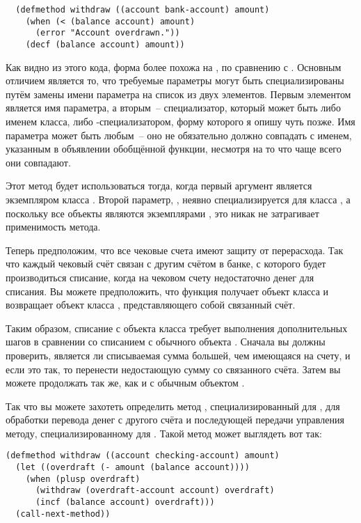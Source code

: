 \begin{lstlisting}
  (defmethod withdraw ((account bank-account) amount)
    (when (< (balance account) amount)
      (error "Account overdrawn."))
    (decf (balance account) amount))
\end{lstlisting}

Как видно из этого кода, форма  более похожа на , по сравнению
с .  Основным отличием является то, что требуемые параметры могут быть
специализированы путём замены имени параметра на список из двух элементов.  Первым
элементом является имя параметра, а вторым~-- специализатор, который может быть либо
именем класса, либо -специализатором, форму которого я опишу чуть позже.  Имя
параметра может быть любым~-- оно не обязательно должно совпадать с именем, указанным в
объявлении обобщённой функции, несмотря на то что чаще всего они совпадают.

Этот метод будет использоваться тогда, когда первый аргумент  является
экземпляром класса .  Второй параметр, , неявно
специализируется для класса , а поскольку все объекты являются экземплярами
, это никак не затрагивает применимость метода.

Теперь предположим, что все чековые счета имеют защиту от перерасхода.  Так что каждый
чековый счёт связан с другим счётом в банке, с которого будет производиться списание,
когда на чековом счету недостаточно денег для списания.  Вы можете предположить, что
функция  получает объект класса  и
возвращает объект класса , представляющего собой связанный счёт.

Таким образом, списание с объекта класса  требует выполнения
дополнительных шагов в сравнении со списанием с обычного объекта .
Сначала вы должны проверить, является ли списываемая сумма большей, чем имеющаяся на
счету, и если это так, то перенести недостающую сумму со связанного счёта.  Затем вы
можете продолжать так же, как и с обычным объектом .

Так что вы можете захотеть определить метод , специализированный для
, для обработки перевода денег с другого счёта и последующей
передачи управления методу, специализированному для .  Такой метод
может выглядеть вот так:

\begin{lstlisting}
(defmethod withdraw ((account checking-account) amount)
  (let ((overdraft (- amount (balance account))))
    (when (plusp overdraft)
      (withdraw (overdraft-account account) overdraft)
      (incf (balance account) overdraft)))
  (call-next-method))
\end{lstlisting}

